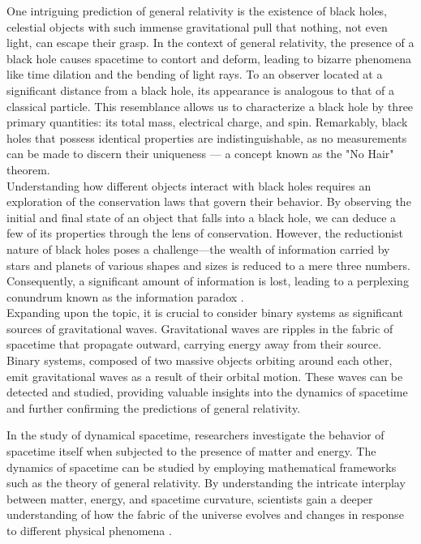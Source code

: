 One intriguing prediction of general relativity is the existence of black holes, celestial objects with such immense gravitational pull that nothing, not even light, can escape their grasp. In the context of general relativity, the presence of a black hole causes spacetime to contort and deform, leading to bizarre phenomena like time dilation and the bending of light rays. To an observer located at a significant distance from a black hole, its appearance is analogous to that of a classical particle. This resemblance allows us to characterize a black hole by three primary quantities: its total mass, electrical charge, and spin. Remarkably, black holes that possess identical properties are indistinguishable, as no measurements can be made to discern their uniqueness \cite{HawMalStr16} — a concept known as the "No Hair" theorem.\\
Understanding how different objects interact with black holes requires an exploration of the conservation laws that govern their behavior. By observing the initial and final state of an object that falls into a black hole, we can deduce a few of its properties through the lens of conservation. However, the reductionist nature of black holes poses a challenge—the wealth of information carried by stars and planets of various shapes and sizes is reduced to a mere three numbers. Consequently, a significant amount of information is lost, leading to a perplexing conundrum known as the information paradox \cite{HawMalStr16}.\\
Expanding upon the topic, it is crucial to consider binary systems as significant sources of gravitational waves. Gravitational waves are ripples in the fabric of spacetime that propagate outward, carrying energy away from their source. Binary systems, composed of two massive objects orbiting around each other, emit gravitational waves as a result of their orbital motion. These waves can be detected and studied, providing valuable insights into the dynamics of spacetime and further confirming the predictions of general relativity. 

In the study of dynamical spacetime, researchers investigate the behavior of spacetime itself when subjected to the presence of matter and energy. The dynamics of spacetime can be studied by employing mathematical frameworks such as the theory of general relativity. By understanding the intricate interplay between matter, energy, and spacetime curvature, scientists gain a deeper understanding of how the fabric of the universe evolves and changes in response to different physical phenomena \cite{DaiVal02}. 

